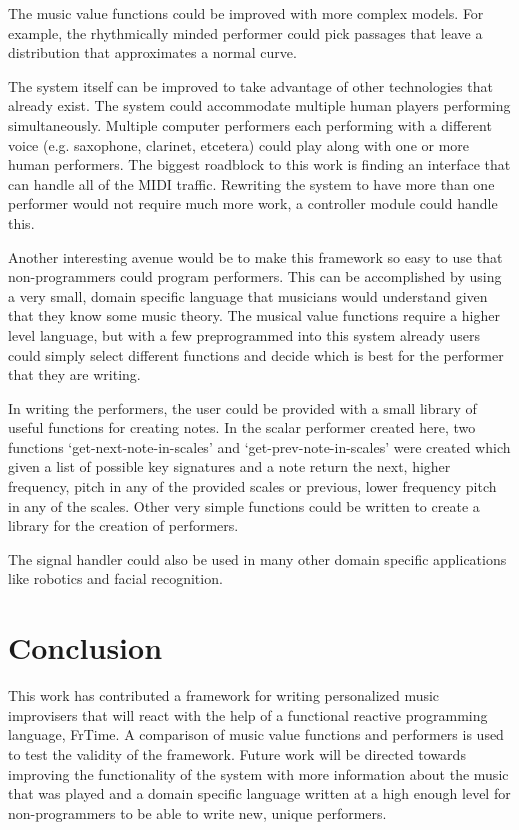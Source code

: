 \documentclass[12pt]{ucthesis}
\begin{document}
The music value functions could be improved with more complex models. For example, the rhythmically minded performer could pick passages that leave a distribution that approximates a normal curve. 

The system itself can be improved to take advantage of other technologies that already exist. The system could accommodate multiple human players performing simultaneously. Multiple computer performers each performing with a different voice (e.g. saxophone, clarinet, etcetera) could play along with one or more human performers. The biggest roadblock to this work is finding an interface that can handle all of the MIDI traffic. Rewriting the system to have more than one performer would not require much more work, a controller module could handle this. 

Another interesting avenue would be to make this framework so easy to use that non-programmers could program performers. This can be accomplished by using a very small, domain specific language that musicians would understand given that they know some music theory. The musical value functions require a higher level language, but with a few preprogrammed into this system already users could simply select different functions and decide which is best for the performer that they are writing. 

In writing the performers, the user could be provided with a small library of useful functions for creating notes. In the scalar performer created here, two functions `get-next-note-in-scales' and `get-prev-note-in-scales' were created which given a list of possible key signatures and a note return the next, higher frequency, pitch in any of the provided scales or previous, lower frequency pitch in any of the scales. Other very simple functions could be written to create a library for the creation of performers. 

The signal handler could also be used in many other domain specific applications like robotics and facial recognition. 

\chapter{Conclusion}
\label{conclusion}

This work has contributed a framework for writing personalized music improvisers that will react with the help of a functional reactive programming language, FrTime. A comparison of music value functions and performers is used to test the validity of the framework. Future work will be directed towards improving the functionality of the system with more information about the music that was played and a domain specific language written at a high enough level for non-programmers to be able to write new, unique performers.



\clearpage


\end{document}
